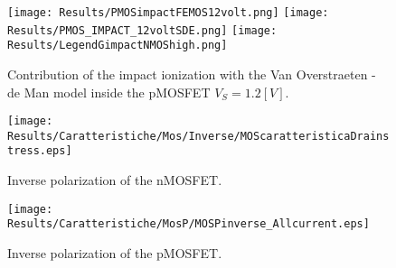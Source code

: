 \begin{figure}[!h]
\vspace{0.5cm}
\centering
{\texttt{[image: Results/PMOSimpactFEMOS12volt.png]}}
\hspace{0.04\textwidth}
{\texttt{[image: Results/PMOS\_IMPACT\_12voltSDE.png]}}
\hspace{0.04\textwidth}
{\texttt{[image: Results/LegendGimpactNMOShigh.png]}}
\caption{Contribution of the impact ionization with the Van Overstraeten - de Man model inside the pMOSFET $V_S=1.2[V]$.}
\label{fig: II pMOS high}
\vspace{0.5cm}
\end{figure}







\begin{figure}[!h]
\texttt{[image: Results/Caratteristiche/Mos/Inverse/MOScaratteristicaDrainstress.eps]}
\caption{Inverse polarization of the nMOSFET.}
\label{fig: tutte le correnti mos stress}
\end{figure}



\vspace{1cm}



\begin{figure}[!h]
\texttt{[image: Results/Caratteristiche/MosP/MOSPinverse\_Allcurrent.eps]}
\caption{Inverse polarization of the pMOSFET.}
\label{fig: tutte le correnti Pmos stress}
\end{figure}








